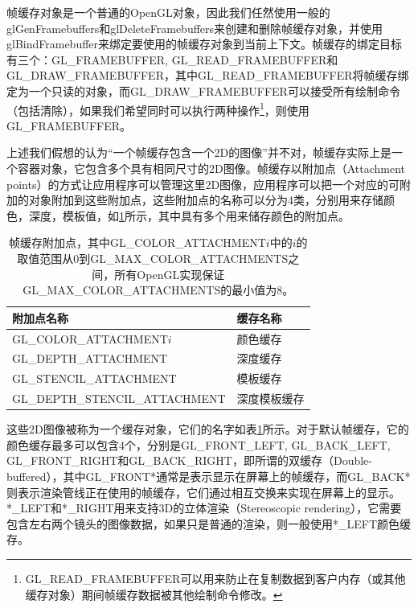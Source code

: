 帧缓存对象是一个普通的OpenGL对象，因此我们任然使用一般的glGenFramebuffers和glDeleteFramebuffers来创建和删除帧缓存对象，并使用glBindFramebuffer来绑定要使用的帧缓存对象到当前上下文。帧缓存的绑定目标有三个：GL\_FRAMEBUFFER, GL\_READ\_FRAMEBUFFER和GL\_DRAW\_FRAMEBUFFER，其中GL\_READ\_FRAMEBUFFER将帧缓存绑定为一个只读的对象，而GL\_DRAW\_FRAMEBUFFER可以接受所有绘制命令（包括清除），如果我们希望同时可以执行两种操作\footnote{GL\_READ\_FRAMEBUFFER可以用来防止在复制数据到客户内存（或其他缓存对象）期间帧缓存数据被其他绘制命令修改。}，则使用GL\_FRAMEBUFFER。

上述我们假想的认为“一个帧缓存包含一个2D的图像”并不对，帧缓存实际上是一个容器对象，它包含多个具有相同尺寸的2D图像。帧缓存以附加点（Attachment points）的方式让应用程序可以管理这里2D图像，应用程序可以把一个对应的可附加的对象附加到这些附加点，这些附加点的名称可以分为4类，分别用来存储颜色，深度，模板值，如\ref{t:api-attachment-points}所示，其中具有多个用来储存颜色的附加点。

\begin{table}
\caption{帧缓存附加点，其中GL\_COLOR\_ATTACHMENT$i$中的$i$的取值范围从0到GL\_MAX\_COLOR\_ATTACHMENTS之间，所有OpenGL实现保证GL\_MAX\_COLOR\_ATTACHMENTS的最小值为8。}
\label{t:api-attachment-points}
\centering
\begin{tabular}{>{\small}p{}|>{\small}p{}}
\hline 
   附加点名称 & 缓存名称\\
    \hline  
    GL\_COLOR\_ATTACHMENT$i$       &颜色缓存\\
    GL\_DEPTH\_ATTACHMENT          &深度缓存\\
    GL\_STENCIL\_ATTACHMENT        &模板缓存\\
    GL\_DEPTH\_STENCIL\_ATTACHMENT &深度模板缓存\\

 \hline 
\end{tabular}
\end{table}

这些2D图像被称为一个缓存对象，它们的名字如表\ref{t:api-attachment-points}所示。对于默认帧缓存，它的颜色缓存最多可以包含4个，分别是GL\_FRONT\_LEFT, GL\_BACK\_LEFT, GL\_FRONT\_RIGHT和GL\_BACK\_RIGHT，即所谓的双缓存（Double-buffered），其中GL\_FRONT*通常是表示显示在屏幕上的帧缓存，而GL\_BACK*则表示渲染管线正在使用的帧缓存，它们通过相互交换来实现在屏幕上的显示。*\_LEFT和*\_RIGHT用来支持3D的立体渲染（Stereoscopic rendering），它需要包含左右两个镜头的图像数据，如果只是普通的渲染，则一般使用*\_LEFT颜色缓存。

